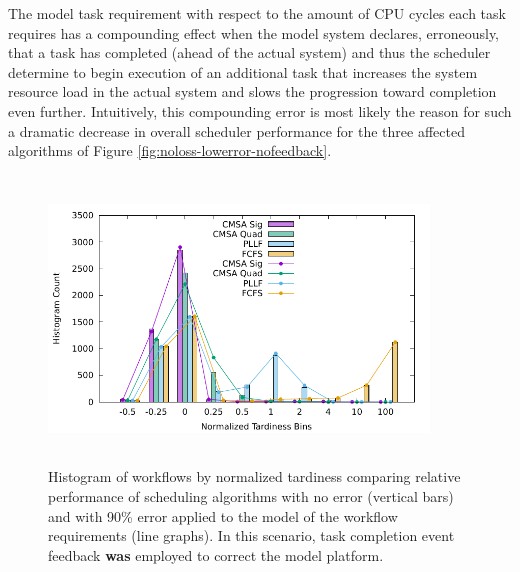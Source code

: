 \documentclass[10pt]{csce}
\begin{document}
The model task requirement with respect to the amount of CPU cycles each task
requires has a compounding effect when the model system declares, erroneously,
that a task has completed (ahead of the actual system) and thus the scheduler
determine to begin execution of an additional task that increases the system
resource load in the actual system and slows the progression toward completion
even further.  Intuitively, this compounding error is most likely the reason
for such a dramatic decrease in overall scheduler performance for the three
affected algorithms of Figure \ref{fig:noloss-lowerror-nofeedback}.

\begin{figure}
	\begin{center}
		\includegraphics[width=0.9\textwidth,height=3in]{figures/Histogram_All_NoLoss_NoBias_HighErrorWithoutModelFinishEvents.pdf}
	\end{center}
	\caption{Histogram of workflows by normalized tardiness comparing relative
		performance of scheduling algorithms with no error (vertical bars) and
		with 90\% error applied to the model of the workflow requirements
		(line graphs).  In this scenario, task completion event feedback
		\textbf{was} employed to correct the model platform.}
	\label{fig:noloss-higherror-nomodel}
\end{figure}
\end{document}
